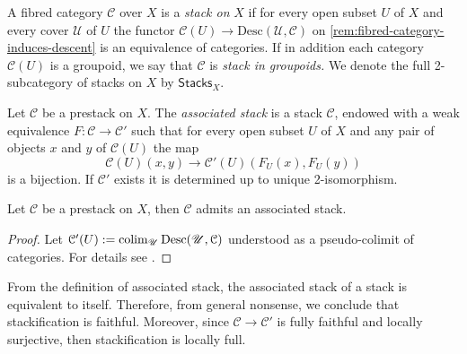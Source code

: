 \begin{definition}\label{def:stack}
	A fibred category $\mathcal{C}$ over $X$ is a \textit{stack on} $X$ if for every open subset $U$ of $X$ and every cover $\mathscr{U}$ of $U$ the functor $\mathcal{C}(U) \to \mathrm{Desc}(\mathscr{U}, \mathcal{C})$ on \cref{rem:fibred-category-induces-descent} is an equivalence of categories. If in addition each category $\mathcal{C}(U)$ is a groupoid, we say that $\mathcal{C}$ is \textit{stack in groupoids.} We denote the full 2-subcategory of stacks on $X$ by $\mathsf{Stacks}_{X}$.
\end{definition}
\begin{definition}\label{def:associated-stack}
	Let $\mathcal{C}$ be a prestack on $X$. The \textit{associated stack} is a stack $\mathcal{C}$, endowed with a weak equivalence $F\colon\mathcal{C} \to \mathcal{C}'$ such that for every open subset $U$ of $X$ and any pair of objects $x$ and $y$ of $\mathcal{C}(U)$ the map
		\[
			\mathcal{C}(U)(x,y) \to \mathcal{C}'(U)(F_{U}(x), F_{U}(y))
		\]
	is a bijection. If $\mathcal{C}'$ exists it is determined up to unique 2-isomorphism. 
\end{definition}
\begin{proposition}\label{prop:stackification}
	Let $\mathcal{C}$ be a prestack on $X$, then $\mathcal{C}$ admits an associated stack. 
\end{proposition}
\begin{proof}
	Let $\mathcal{C}'(U) := \operatorname*{co{\lim}}_{\mathscr{U}}\mathrm{Desc}(\mathscr{U}, \mathcal{C})$ understood as a pseudo-colimit of categories. For details see \cite[\href{https://stacks.math.columbia.edu/tag/02ZN}{Tag 02ZN}]{stacks-project}. 
\end{proof}
\begin{remark}\label{rem:stackification-is-faithful-and-locally-full}
	From the definition of associated stack, the associated stack of a stack is equivalent to itself. Therefore, from general nonsense, we conclude that stackification is faithful. Moreover, since $\mathcal{C} \to \mathcal{C'}$ is fully faithful and locally surjective, then stackification is locally full. 
\end{remark}
